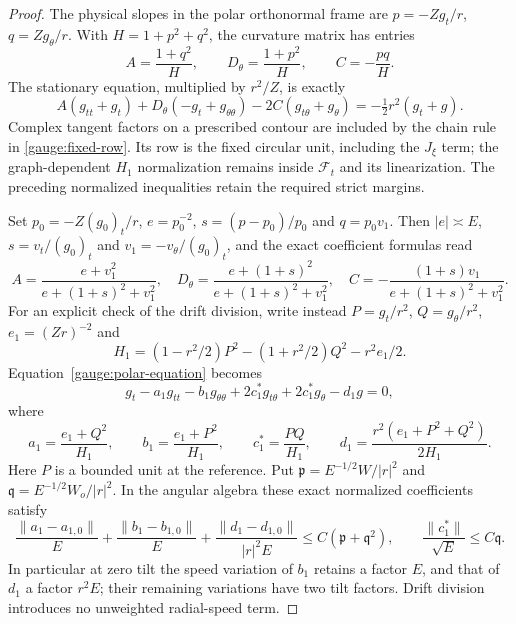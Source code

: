 \begin{proof}
The physical slopes in the polar orthonormal frame are
$p=-Zg_t/r$, $q=Zg_\theta/r$.  With $H=1+p^2+q^2$, the curvature
matrix has entries
\begin{equation}
 A=\frac{1+q^2}{H},\qquad D_\theta=\frac{1+p^2}{H},\qquad
 C=-\frac{pq}{H}.
 \label{gauge:polar-matrix}
\end{equation}
The stationary equation, multiplied by $r^2/Z$, is exactly
\begin{equation}
 A(g_{tt}+g_t)+D_\theta(-g_t+g_{\theta\theta})
 -2C(g_{t\theta}+g_\theta)
       =-\tfrac12r^2(g_t+g).
 \label{gauge:polar-equation}
\end{equation}
Complex tangent factors on a prescribed contour are included by the chain
rule in \eqref{gauge:fixed-row}.  Its row is the fixed circular unit,
including the $J_\xi$ term; the graph-dependent $H_1$ normalization remains
inside $\mathcal F_t$ and its linearization.  The preceding normalized
inequalities retain the required strict margins.

Set $p_0=-Z(g_0)_t/r$, $e=p_0^{-2}$, $s=(p-p_0)/p_0$ and $q=p_0 v_1$.
Then $|e|\asymp E$, $s= v_t/(g_0)_t$ and
$v_1=-v_\theta/(g_0)_t$, and the exact coefficient formulas read
\begin{equation}
 A=\frac{e+v_1^2}{e+(1+s)^2+v_1^2},\quad
 D_\theta=\frac{e+(1+s)^2}{e+(1+s)^2+v_1^2},\quad
 C=-\frac{(1+s)v_1}{e+(1+s)^2+v_1^2}.
 \label{gauge:relative-coefficients}
\end{equation}
For an explicit check of the drift division, write instead
$P=g_t/r^2$, $Q=g_\theta/r^2$, $e_1=(Zr)^{-2}$ and
\[
 H_1=(1-r^2/2)P^2-(1+r^2/2)Q^2-r^2e_1/2.
\]
Equation~\eqref{gauge:polar-equation} becomes
\begin{equation}
 g_t-a_1g_{tt}-b_1g_{\theta\theta}
       +2c_1^*g_{t\theta}+2c_1^*g_\theta-d_1g=0,
 \label{gauge:polar-normalized}
\end{equation}
where
\[
 a_1=\frac{e_1+Q^2}{H_1},\qquad
 b_1=\frac{e_1+P^2}{H_1},\qquad
 c_1^*=\frac{PQ}{H_1},\qquad
 d_1=\frac{r^2(e_1+P^2+Q^2)}{2H_1}.
\]
Here $P$ is a bounded unit at the reference.  Put
$\mathfrak p=E^{-1/2}W/|r|^2$ and
$\mathfrak q=E^{-1/2}W_o/|r|^2$.  In the angular algebra these exact
normalized coefficients satisfy
\begin{equation}
 \frac{\|a_1-a_{1,0}\|}{E}
 +\frac{\|b_1-b_{1,0}\|}{E}
 +\frac{\|d_1-d_{1,0}\|}{|r|^2E}
 \le C(\mathfrak p+\mathfrak q^2),\qquad
 \frac{\|c_1^*\|}{\sqrt E}\le C\mathfrak q.
 \label{gauge:relative-normalized}
\end{equation}
In particular at zero tilt the speed variation of $b_1$ retains a
factor $E$, and that of $d_1$ a factor $r^2E$; their remaining variations
have two tilt factors.  Drift division introduces no unweighted
radial-speed term.


\end{proof}
